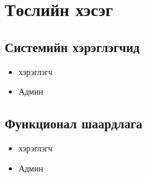 \chapter{Төслийн хэсэг}
\label{chap:intro}
\section{Системийн хэрэглэгчид}
\begin{itemize}
	\item  хэрэглэгч
	\item  Админ
\end{itemize}
\section{Функционал шаардлага}
\begin{itemize}
	\item  хэрэглэгч
	\item  Админ
\end{itemize}
